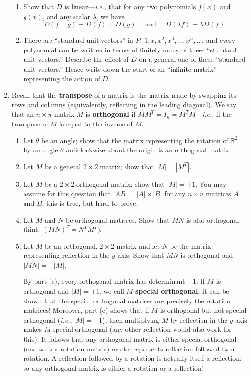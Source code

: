 \documentclass{article}
\begin{document}
\begin{enumerate}
		\begin{enumerate}
			\item Show that $D$ is linear---\textit{i.e.}, that for any two polynomials $f(x)$ and $g(x)$, and any scalar $\lambda$, we have
				\[D(f+g)=D(f)+D(g)\quad\mbox{ and }\quad D(\lambda f)=\lambda D(f).\]
			\item There are ``standard unit vectors'' in $P$: $1,x,x^2,x^3,\hdots,x^n,\hdots$, and every polynomial can be written in terms of finitely many of these ``standard unit vectors.'' Describe the effect of $D$ on a general one of these ``standard unit vectors.'' Hence write down the start of an ``infinite matrix'' representing the action of $D$.
		\end{enumerate}
	\item Recall that the \textbf{transpose} of a matrix is the matrix made by swapping its rows and columns (equivalently, reflecting in the leading diagonal). We say that an $n\times n$ matrix $M$ is \textbf{orthogonal} if $MM^T=I_n=M^TM$---\textit{i.e.}, if the transpose of $M$ is equal to the inverse of $M$.
		\begin{enumerate}
			\item Let $\theta$ be an angle; show that the matrix representing the rotation of $\mathbb{R}^2$ by an angle $\theta$ anticlockwise about the origin is an orthogonal matrix.
			\item Let $M$ be a general $2\times 2$ matrix; show that $|M|=|M^T|$.
			\item Let $M$ be a $2\times 2$ orthogonal matrix; show that $|M|=\pm 1$. You may assume for this question that $|AB|=|A|\times |B|$ for any $n\times n$ matrices $A$ and $B$; this is true, but hard to prove.
			\item Let $M$ and $N$ be orthogonal matrices. Show that $MN$ is also orthogonal (hint: $(MN)^T=N^TM^T$).
			\item Let $M$ be an orthogonal, $2\times 2$ matrix and let $N$ be the matrix representing reflection in the $y$-axis. Show that $MN$ is orthogonal and $|MN|=-|M|$.\medskip
			
			By part (c), every orthogonal matrix has determinant $\pm 1$. If $M$ is orthogonal and $|M|=+1$, we call $M$ \textbf{special orthogonal}. It can be shown that the special orthogonal matrices are precisely the rotation matrices! Moreover, part (e) shows that if $M$ is orthogonal but not special orthogonal (\textit{i.e.}, $|M|=-1$), then multiplying $M$ by reflection in the $y$-axis makes $M$ special orthogonal (any other reflection would also work for this). It follows that any orthogonal matrix is either special orthogonal (and so is a rotation matrix) or else represents reflection followed by a rotation. A reflection followed by a rotation is actually itself a reflection; so any orthogonal matrix is either a rotation or a reflection!
			

\end{enumerate}
\end{enumerate}
\end{document}
